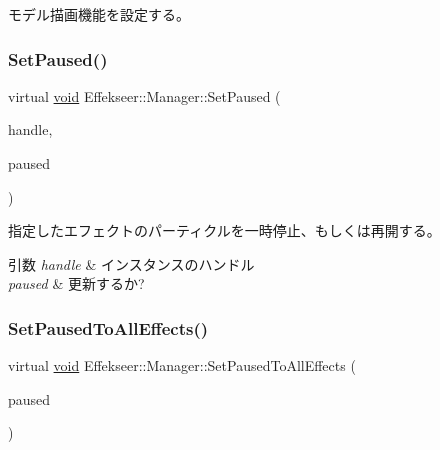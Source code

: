 モデル描画機能を設定する。 

\mbox{\label{class_effekseer_1_1_manager_a6414ea849302b7cef51b61a38c7ecd76}} 
\subsubsection{\texorpdfstring{Set\+Paused()}{SetPaused()}}
{\footnotesize\ttfamily virtual \mbox{\hyperlink{namespace_effekseer_ab34c4088e512200cf4c2716f168deb56}{void}} Effekseer\+::\+Manager\+::\+Set\+Paused (\begin{DoxyParamCaption}\item[{\mbox{\hyperlink{namespace_effekseer_afba58b8d812da862190e9bbfc040824a}{Handle}}}]{handle,  }\item[{bool}]{paused }\end{DoxyParamCaption})\hspace{0.3cm}{\ttfamily [pure virtual]}}



指定したエフェクトのパーティクルを一時停止、もしくは再開する。 


\begin{DoxyParams}{引数}
{\em handle} & インスタンスのハンドル \\
\hline
{\em paused} & 更新するか? \\
\hline
\end{DoxyParams}
\mbox{\label{class_effekseer_1_1_manager_a08c4c39a56fcc93b8acb284ff9bc933b}} 
\subsubsection{\texorpdfstring{Set\+Paused\+To\+All\+Effects()}{SetPausedToAllEffects()}}
{\footnotesize\ttfamily virtual \mbox{\hyperlink{namespace_effekseer_ab34c4088e512200cf4c2716f168deb56}{void}} Effekseer\+::\+Manager\+::\+Set\+Paused\+To\+All\+Effects (\begin{DoxyParamCaption}\item[{bool}]{paused }\end{DoxyParamCaption})\hspace{0.3cm}{\ttfamily [pure virtual]}}



